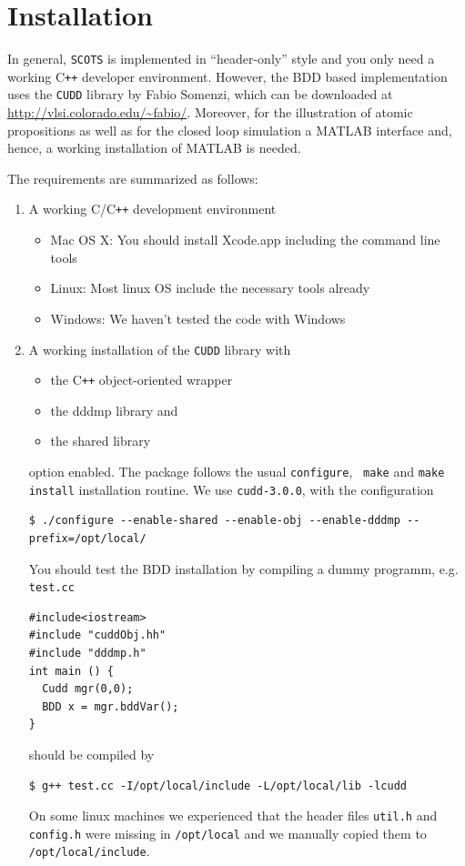 \documentclass[a4paper]{amsart}
\newcommand\Cpp{C\texttt{++} }
\begin{document}
\section{Installation}
\label{s:req}

In general, {\tt SCOTS} is implemented in ``header-only'' style and you only
need a working \Cpp developer environment. However, the BDD based
implementation uses the {\tt CUDD} library by Fabio Somenzi, which can be downloaded at
  \url{http://vlsi.colorado.edu/~fabio/}. 
Moreover, for the illustration of atomic propositions as well as for the closed
loop simulation a MATLAB interface and, hence, a working installation of MATLAB is needed.  

The requirements are summarized as follows:

\begin{enumerate}
  \item A working C/\Cpp{} development environment
    \begin{itemize}
      \item Mac OS X: You should install Xcode.app including the command line tools
      \item Linux: Most linux OS include the necessary tools already
      \item Windows: We haven't tested the code with Windows
    \end{itemize}

  \item A working installation of the {\tt CUDD} library with 
     \begin{itemize}
      \item the \Cpp{} object-oriented wrapper
      \item the dddmp library and
      \item the shared library 
    \end{itemize}
   option enabled. The package follows the usual {\tt \small configure}, {\tt
   \small make} and
   {\tt \small make install} installation routine. We use {\tt \small cudd-3.0.0}, with the
   configuration
\begin{lstlisting}[basicstyle=\small\ttfamily,frame=none]
  $ ./configure --enable-shared --enable-obj --enable-dddmp --prefix=/opt/local/
\end{lstlisting}
You should test the BDD installation by compiling a dummy
programm, e.g. {\tt \small test.cc} 
\begin{lstlisting}[basicstyle=\footnotesize\ttfamily]
#include<iostream>
#include "cuddObj.hh"
#include "dddmp.h"
int main () {
  Cudd mgr(0,0);
  BDD x = mgr.bddVar();
}
\end{lstlisting}
should be compiled by
\begin{lstlisting}[basicstyle=\small\ttfamily,frame=none]
  $ g++ test.cc -I/opt/local/include -L/opt/local/lib -lcudd
\end{lstlisting}
On some linux machines we experienced that the header files {\tt \small util.h} and
{\tt \small config.h} were missing in {\tt \small /opt/local} and we manually
copied them to {\tt \small /opt/local/include}.


\end{enumerate}
\end{document}
